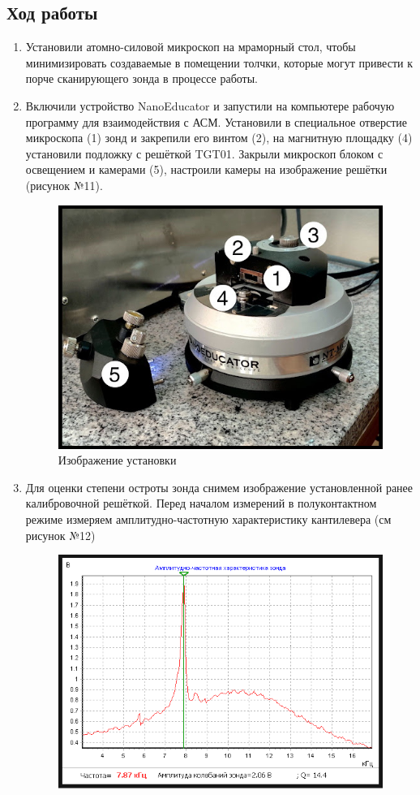 \documentclass[a4paper,12pt]{article}
\theoremstyle{plain} %
\theoremstyle{definition} %
\theoremstyle{remark} %
\begin{document}
\begin{itemize}
\section{Ход работы}
\begin{enumerate}
	\item
	 Установили атомно-силовой микроскоп на мраморный стол, чтобы минимизировать создаваемые в помещении толчки, которые могут привести к порче сканирующего зонда в процессе работы.
	\item
	 Включили устройство NanoEducator и запустили на компьютере рабочую программу для взаимодействия с АСМ. Установили в специальное отверстие микроскопа (1) зонд и закрепили его винтом (2), на магнитную площадку (4) установили подложку с решёткой TGT01. Закрыли микроскоп блоком с освещением и камерами (5), настроили камеры на изображение решётки (рисунок №11).
	 \begin{figure}[h!]
	 	\centering
	 	\includegraphics[scale=0.9]{pic12.jpg}
	 	\caption{Изображение установки}
	 	\label{pic12}
	 \end{figure}
	\item
	Для оценки степени остроты зонда снимем изображение установленной ранее калибровочной решёткой. Перед началом измерений в полуконтактном режиме измеряем амплитудно-частотную характеристику кантилевера (см рисунок №12)
	\begin{figure}[h!]
		\centering
		\includegraphics[scale=0.8]{pic13.png}

\end{figure}
\end{enumerate}
\end{itemize}
\end{document}
